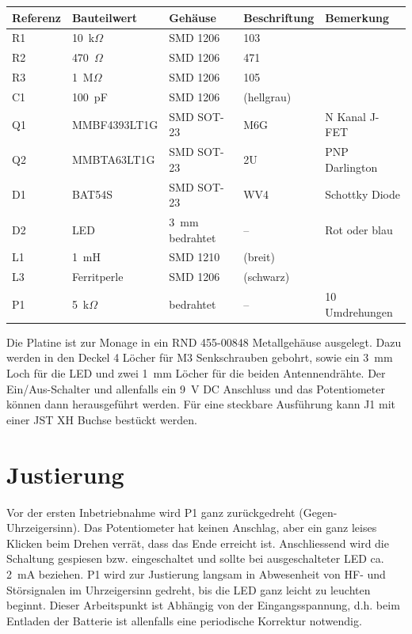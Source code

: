 \documentclass[a4paper,11pt,halfparskip,smallheadings,DIV=10]{scrartcl}
\begin{document}
\begin{center}\begin{tabular}{lllll}\toprule
    \textbf{Referenz} & \textbf{Bauteilwert} & \textbf{Gehäuse} & \textbf{Beschriftung} & \textbf{Bemerkung}\\\midrule
R1 & 10~k$\Omega$ & SMD 1206 & 103 & \\
R2 & 470~$\Omega$ & SMD 1206 & 471 & \\
R3 & 1~M$\Omega$  & SMD 1206 & 105 & \\
C1 & 100~pF       & SMD 1206 & (hellgrau) & \\
Q1 & MMBF4393LT1G & SMD SOT-23 & M6G & N Kanal J-FET\\ %
Q2 & MMBTA63LT1G  & SMD SOT-23 & 2U & PNP Darlington\\ 
D1 & BAT54S       & SMD SOT-23 & WV4 & Schottky Diode\\ %
D2 & LED          & 3~mm bedrahtet & -- & Rot oder blau\\
L1 & 1~mH         & SMD 1210   & (breit) & \\
L3 & Ferritperle  & SMD 1206   & (schwarz) & \\
P1 & 5~k$\Omega$  & bedrahtet  & -- & 10 Umdrehungen\\\bottomrule
\end{tabular}\end{center}

Die Platine ist zur Monage in ein RND 455-00848 Metallgehäuse ausgelegt. Dazu
werden in den Deckel 4 Löcher für M3 Senkschrauben gebohrt, sowie ein 3~mm
Loch für die LED und zwei 1~mm Löcher für die beiden Antennendrähte. Der
Ein/Aus-Schalter und allenfalls ein 9~V DC Anschluss und das Potentiometer
können dann herausgeführt werden. Für eine steckbare Ausführung kann J1
mit einer JST XH Buchse bestückt werden.

\section{Justierung}
Vor der ersten Inbetriebnahme wird P1 ganz zurückgedreht (Gegen-Uhrzeigersinn).
Das Potentiometer hat keinen Anschlag, aber ein ganz leises Klicken beim
Drehen verrät, dass das Ende erreicht ist. Anschliessend wird die Schaltung gespiesen
bzw. eingeschaltet und sollte bei ausgeschalteter LED ca. 2~mA beziehen. P1
wird zur Justierung langsam in Abwesenheit von HF- und Störsignalen im
Uhrzeigersinn gedreht, bis die LED ganz leicht zu leuchten beginnt. Dieser
Arbeitspunkt ist Abhängig von der Eingangsspannung, d.h. beim Entladen der
Batterie ist allenfalls eine periodische Korrektur notwendig.
\end{document}
